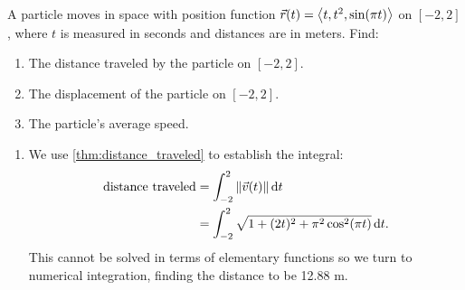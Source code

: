 \begin{example}\label{ex_motion6}%
A particle moves in space with position function $\vec r(t) =\left\langle t,t^2,\sin (\pi t)\right\rangle$ on $[-2,2]$, where $t$ is measured in seconds and distances are in meters. Find:
\begin{enumerate}
	\item The distance traveled by the particle on $[-2,2]$.
	\item	The displacement of the particle on $[-2,2]$.
	\item	The particle's average speed.
\end{enumerate}
\solution
\begin{enumerate}
	\item We use \autoref{thm:distance_traveled} to establish the integral:
	\begin{align*}
	\text{distance traveled}
	&= \int_{-2}^2 \left\lVert \vec v(t) \right\rVert\operatorname{d}\! t \\
	&= \int_{-2}^2 \sqrt{1+(2t)^2+ \pi^2\cos^2(\pi t)}\operatorname{d}\! t.
	\end{align*}
	This cannot be solved in terms of elementary functions so we turn to numerical integration, finding the distance to be 12.88 m.
	
	\iftoggle{in_threeD}{%
	\mtable{The path of the particle in \autoref{ex_motion6}.}{fig:motion6}{
	\myincludeasythree{
3Droll=-1.3988262638349023,
3Dortho=0.004399999976158142,
3Dc2c=0.5026575922966003 0.7320348024368286 0.4598483145236969,
3Dcoo=-14.488340377807617 25.037630081176758 5.939126491546631,
3Droo=150.0000062372992}{\marginparwidth}{Blue 3-D space curve r(t) of Example 12.3.7; axes at ±2; arrow on curve indicates direction of motion through (0, –2, 3).}{figures/figmotion6_3D}}
	}%
	{%
	\mtable{The path of the particle, from two perspectives, in \autoref{ex_motion6}.}{fig:motion6}{%
	\myincludegraphics[alt={Blue 3-D space curve r(t) of Example 12.3.7; axes at ±2; arrow on curve indicates direction of motion through (0, –2, 3).},width=\marginparwidth]{figures/raw/figmotion6}\\[-20pt]
	(a)\\[20pt]
	\myincludegraphics[alt={Blue 3-D space curve r(t) of Example 12.3.7; axes at ±2; arrow on curve indicates direction of motion through (0, –2, 3).},width=\marginparwidth]{figures/figmotion6_3D}\\
	(b)
	}%
	}%
	

\end{enumerate}
\end{example}
